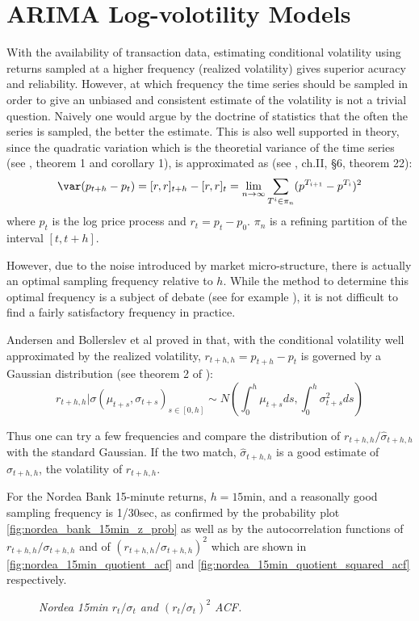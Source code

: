 \section{ARIMA Log-volotility Models}\label{sec:SLV_model}
With the availability of transaction data, estimating conditional
volatility using returns sampled at a higher frequency (realized
volatility) gives superior acuracy and reliability. However, at which
frequency the time series should be sampled in order to give an
unbiased and consistent estimate of the volatility is not a trivial
question. Naively one would argue by the doctrine of statistics that
the often the series is sampled, the better the estimate. This is also
well supported in theory, since the quadratic variation which is the
theoretial variance of the time series (see \cite{Andersen03}, theorem
1 and corollary 1), is approximated as (see \cite{Protter05}, ch.II,
\S6, theorem 22):
\[
\var(p_{t+h} - p_t) = [r, r]_{t+h} - [r, r]_t = \lim_{n \to \infty}
\sum_{T^i \in \pi_n} (p^{T_{i+1}} - p^{T_i})^2
\]
where $p_t$ is the log price process and $r_t = p_t - p_0$. $\pi_n$
is a refining partition of the interval $[t, t+h]$.

However, due to the noise introduced by market micro-structure, there
is actually an optimal sampling frequency relative to $h$. While the
method to determine this optimal frequency is a subject of debate (see
for example \cite{Sahalia05}), it is not difficult to find a fairly
satisfactory frequency in practice.

Andersen and Bollerslev et al proved in \cite{Andersen03} that, with
the conditional volatility well approximated by the realized
volatility, $r_{t+h, h} = p_{t+h} - p_t$ is governed by a Gaussian
distribution (see theorem 2 of \cite{Andersen03}):
\[
r_{t+h, h} | \sigma(\mu_{t+s}, \sigma_{t+s})_{s \in [0, h]} \sim
N(\int_{0}^h \mu_{t+s} ds, \int_{0}^h \sigma_{t+s}^2 ds)
\]

Thus one can try a few frequencies and compare the distribution of
$r_{t+h, h}/\hat{\sigma}_{t+h, h}$ with the standard Gaussian. If the
two match, $\hat{\sigma}_{t+h, h}$ is a good estimate of $\sigma_{t+h,
  h}$, the volatility of $r_{t+h, h}$.

For the Nordea Bank 15-minute returns, $h = 15\text{min}$, and a
reasonally good sampling frequency is 1/30sec, as confirmed by the
probability plot \ref{fig:nordea_bank_15min_z_prob} as well as by the
autocorrelation functions of $r_{t+h, h} / \sigma_{t+h, h}$ and of
$(r_{t+h, h} / \sigma_{t+h, h})^2$ which are shown in
\ref{fig:nordea_15min_quotient_acf} and
\ref{fig:nordea_15min_quotient_squared_acf} respectively.
\begin{figure}[htb!]
  \centering
  \caption{\small \it Nordea 15min $r_t/\sigma_t$ and
    $(r_t/\sigma_t)^2$ ACF.}
\end{figure}

